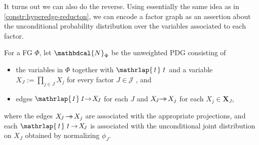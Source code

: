 \documentclass[letterpaper]{article} %
\theoremstyle{plain}
\theoremstyle{definition}
\theoremstyle{remark}
\newcommand\mat[1]{\mathbf{#1}}
\newcommand{\tto}{\rightarrow\mathrel{\mspace{-15mu}}\rightarrow}
\newcommand{\bp}[1][L]{\mat{p}_{\!_{#1}\!}}
\newcommand{\dg}[1]{\mathbdcal{#1}}
\newcommand{\pdgunit}{\mathrlap{\mathit 1} \mspace{2.3mu}\mathit 1}
\newcommand{\PDGof}[1]{{\dg M}_{#1}}
\newcommand{\UPDGof}[1]{{\dg N}_{#1}}
\begin{document}
It turns out we can also do the reverse. 
Using essentially the same idea as in \cref{constr:hyperedge-reducton},
we can encode a factor graph as an assertion about the unconditional
probability distribution over the variables associated to each
factor.  

\begin{defn} \label{def:fg2PDG}
For a FG $\Phi$, let $\UPDGof{\Phi}$ be
the unweighted PDG consisting of
\begin{itemize}
	\item the variables in $\Phi$ together
   with $\pdgunit$ and a variable $X_{\!J} := \prod_{j \in J} X_j$ for every factor $J \in \mathcal J$%
   , and
   \item edges ${\pdgunit} \!\!\to\! X_{\!J}$ for each $J$ and $X_{\!J} \!\!\tto\! X_j$ for each $X_j \in \mat X_J$,
\end{itemize}
where the edges $ X_{\!J} \!\tto\! X_j$ are associated with the appropriate projections, and each ${\pdgunit} \!\to\! X_{\!J}$ is associated with the unconditional joint distribution on $X_J$ obtained by normalizing $\phi_J$. 

\end{defn}
\end{document}
